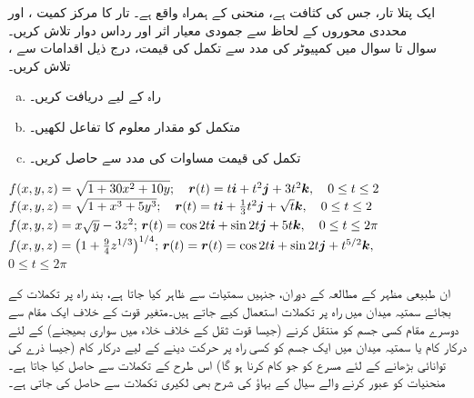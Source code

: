 %
ایک پتلا تار،  جس کی کثافت  ہے،  منحنی  کے ہمراہ واقع  ہے۔  تار کا مرکز کمیت ، اور محددی محوروں کے لحاظ سے جمودی معیار اثر اور رداس دوار تلاش کریں۔
\\
سوال  تا سوال  میں کمپیوٹر کی مدد سے     تکمل کی قیمت، درج ذیل اقدامات سے ، تلاش کریں۔
\begin{enumerate}[a.]
\item
راہ  کے لیے  دریافت کریں۔
\item
متکمل  کو مقدار معلوم   کا تفاعل لکھیں۔
\item
تکمل  کی قیمت مساوات  کی مدد سے حاصل  کریں۔ 
\end{enumerate}
%
\(f(x,y,z)=\sqrt{1+30x^2+10y};\quad {\ensuremath{{\boldsymbol{r}}}}(t)=t{\boldsymbol{i}}+t^2{\boldsymbol{j}}+3t^2{\boldsymbol{k}},\quad 0\le t\le 2\)
%
\(f(x,y,z)=\sqrt{1+x^3+5y^3};\quad {\ensuremath{{\boldsymbol{r}}}}(t)=t{\boldsymbol{i}}+\frac{1}{3}t^2{\boldsymbol{j}}+\sqrt{t}{\boldsymbol{k}},\quad 0\le t\le 2\)
%
\(f(x,y,z)=x\sqrt{y}-3z^2;\,{{\boldsymbol{r}}}(t)=\cos 2t {\boldsymbol{i}}+\sin 2t{\boldsymbol{j}}+5t{\boldsymbol{k}},\quad 0\le t\le 2\pi\)
%
\(f(x,y,z)=\big(1+\frac{9}{4}z^{1/3}\big)^{1/4};\, {{\boldsymbol{r}}}(t)={{\boldsymbol{r}}}(t)=\cos 2t {\boldsymbol{i}}+\sin 2t{\boldsymbol{j}}+t^{5/2}{\boldsymbol{k}},\)\\
\( 0\le t\le 2\pi\quad\quad\quad\quad\quad\quad\)


ان طبیعی  مظہر  کے مطالعہ کے دوران، جنہیں سمتیات سے ظاہر کیا جاتا ہے، بند راہ پر تکملات کے بجائے سمتیہ میدان میں راہ پر تکملات استعمال کیے جاتے ہیں۔متغیر قوت کے خلاف ایک مقام سے دوسرے  مقام کسی جسم کو منتقل کرنے    (جیسا قوت ثقل کے خلاف خلاء میں سواری بھیجنے) کے لئے درکار کام    یا سمتیہ میدان میں ایک جسم کو کسی راہ پر حرکت دینے  کے لیے درکار کام  (جیسا  ذرے کی توانائی بڑھانے کے لئے مسرع کو  جو کام کرنا ہو گا)     اس طرح کے تکملات سے حاصل کیا جاتا ہے۔  منحنیات کو  عبور کرنے والے  سیال کے بہاؤ کی شرح بھی لکیری تکملات سے حاصل کی جاتی ہے۔

